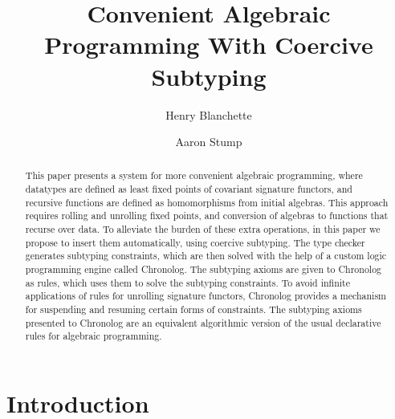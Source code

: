 \documentclass[runningheads]{llncs}
\begin{document}
%
\title{Convenient Algebraic Programming With Coercive Subtyping}
%
%
\author{%
Henry Blanchette \and
Aaron Stump%
}
%
%
%
\maketitle              %
%
\begin{abstract}
This paper presents a system for more convenient algebraic
programming, where datatypes are defined as least fixed points of covariant
signature functors, and recursive functions are defined as homomorphisms from
initial algebras. This approach requires rolling and unrolling fixed points, and
conversion of algebras to functions that recurse over data. To alleviate the
burden of these extra operations, in this paper we propose to insert them
automatically, using coercive subtyping. The type checker generates subtyping
constraints, which are then solved with the help of a custom logic programming
engine called Chronolog. The subtyping axioms are given to Chronolog as rules,
which uses them to solve the subtyping constraints. To avoid infinite
applications of rules for unrolling signature functors, Chronolog provides a
mechanism for suspending and resuming certain forms of constraints. The
subtyping axioms presented to Chronolog are an equivalent algorithmic version of
the usual declarative rules for algebraic programming.

\end{abstract}
%
%
%
\section{Introduction} %

\end{document}
